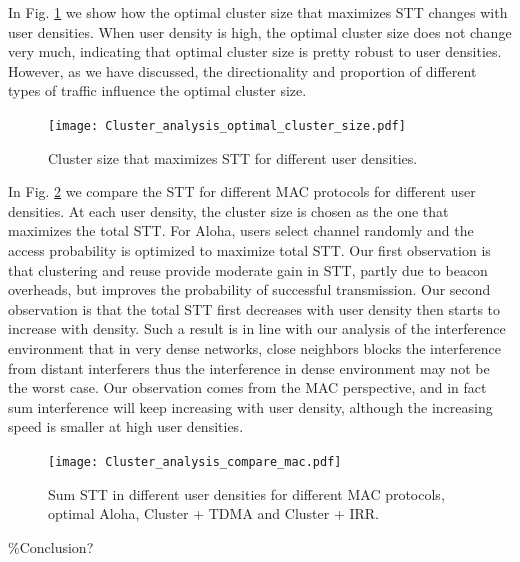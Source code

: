 \documentclass[10pt, conference, letterpaper]{IEEEtran}
\begin{document}
In Fig. \ref{fig:clustereanalysis:optimal_cluster_size} we show how the optimal cluster size that maximizes STT changes with user densities. When user density is high, the optimal cluster size does not change very much, indicating that optimal cluster size is pretty robust to user densities. However, as we have discussed, the directionality and proportion of different types of traffic influence the optimal cluster size. 

\begin{figure}
	\centering
	\texttt{[image: Cluster\_analysis\_optimal\_cluster\_size.pdf]}
	\caption{Cluster size that maximizes STT for different user densities.}
	\label{fig:clustereanalysis:optimal_cluster_size}
\end{figure}

In Fig. \ref{fig:clusteranalysis:compare_mac} we compare the STT for different MAC protocols for different user densities. At each user density, the cluster size is chosen as the one that maximizes the total STT. For Aloha, users select channel randomly and the access probability is optimized to maximize total STT. Our first observation is that clustering and reuse provide moderate gain in STT, partly due to beacon overheads, but improves the probability of successful transmission. Our second observation is that the total STT first decreases with user density then starts to increase with density. Such a result is in line with our analysis of the interference environment that in very dense networks, close neighbors blocks the interference from distant interferers thus the interference in dense environment may not be the worst case. Our observation comes from the MAC perspective, and in fact sum interference will keep increasing with user density, although the increasing speed is smaller at high user densities. 

\begin{figure}
	\centering
	\texttt{[image: Cluster\_analysis\_compare\_mac.pdf]}
	\caption{Sum STT in different user densities for different MAC protocols, optimal Aloha, Cluster + TDMA and Cluster + IRR.}
	\label{fig:clusteranalysis:compare_mac}
\end{figure}

\%Conclusion?
\end{document}
